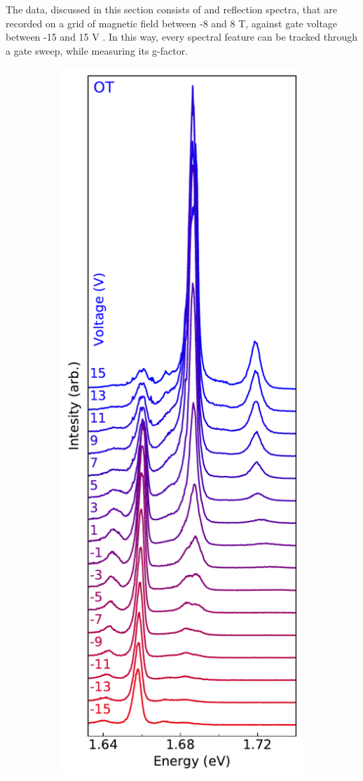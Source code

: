 The data, discussed in this section consists of \pl and reflection spectra, that are recorded on a grid of magnetic field between -8 and 8 T, against gate voltage between -15 and 15 V . In this way, every spectral feature can be tracked through a gate sweep, while measuring its g-factor.

\begin{figure}[h]
	\begin{subfigure}{0.32\textwidth}
		\caption{}
		\includegraphics[width=\textwidth]{waterfall_0T}

\end{subfigure}
\end{figure}
